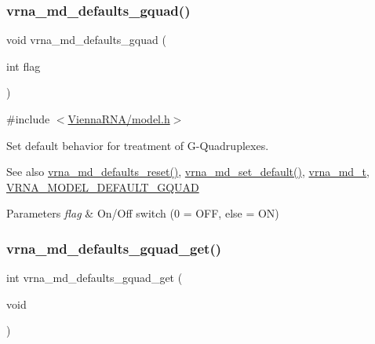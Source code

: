 \subsubsection{\texorpdfstring{vrna\_md\_defaults\_gquad()}{vrna\_md\_defaults\_gquad()}}
{\footnotesize\ttfamily void vrna\+\_\+md\+\_\+defaults\+\_\+gquad (\begin{DoxyParamCaption}\item[{int}]{flag }\end{DoxyParamCaption})}



{\ttfamily \#include $<$\mbox{\hyperlink{model_8h}{Vienna\+R\+N\+A/model.\+h}}$>$}



Set default behavior for treatment of G-\/\+Quadruplexes. 

\begin{DoxySeeAlso}{See also}
\mbox{\hyperlink{group__model__details_ga70834424cf804d149937de89f80ceb45}{vrna\+\_\+md\+\_\+defaults\+\_\+reset()}}, \mbox{\hyperlink{group__model__details_ga8ac6ff84936282436f822644bf841f66}{vrna\+\_\+md\+\_\+set\+\_\+default()}}, \mbox{\hyperlink{group__model__details_ga1f8a10e12a0a1915f2a4eff0b28ea17c}{vrna\+\_\+md\+\_\+t}}, \mbox{\hyperlink{group__model__details_ga793ed812e86f43799b14b2deee917f23}{V\+R\+N\+A\+\_\+\+M\+O\+D\+E\+L\+\_\+\+D\+E\+F\+A\+U\+L\+T\+\_\+\+G\+Q\+U\+AD}} 
\end{DoxySeeAlso}

\begin{DoxyParams}{Parameters}
{\em flag} & On/\+Off switch (0 = O\+FF, else = ON) \\
\hline
\end{DoxyParams}
\mbox{\label{group__model__details_gae645b8612f879eb38b45244fa9eddb9e}} 
\subsubsection{\texorpdfstring{vrna\_md\_defaults\_gquad\_get()}{vrna\_md\_defaults\_gquad\_get()}}
{\footnotesize\ttfamily int vrna\+\_\+md\+\_\+defaults\+\_\+gquad\+\_\+get (\begin{DoxyParamCaption}\item[{void}]{ }\end{DoxyParamCaption})}



